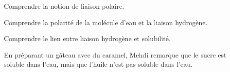 \tetePremStssBiom
\vspace*{-30pt}


\begin{objectifs}
  \item Comprendre la notion de liaison polaire.
  \item Comprendre la polarité de la molécule d'eau et la liaison hydrogène.
  \item Comprendre le lien entre liaison hydrogène et solubilité.
\end{objectifs}

\begin{contexte}
  En préparant un gâteau avec du caramel, Mehdi remarque que le sucre est soluble dans l'eau, mais que l'huile n'est pas soluble dans l'eau.
  
\end{contexte}


